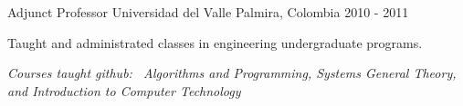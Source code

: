 \begin{cventries}

\cventry
{Adjunct Professor} %
{Universidad del Valle} %
{Palmira, Colombia} %
{2010 - 2011} %
{ %
\begin{cvitems}
\item {Taught and administrated classes in engineering undergraduate programs.}
\end{cvitems}
\vspace{\acvDescAfterDutiesSkip}
\textit{Courses taught github:~ Algorithms and Programming, Systems General Theory, and Introduction to Computer Technology}
}

\end{cventries}